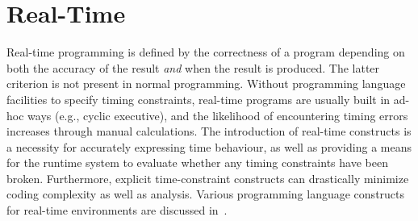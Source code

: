 \documentclass[openright,twoside]{report}
\begin{document}
\begin{comment}
To obtain parallel execution, it is necessary to create a number of virtual processors so more than one task can be scheduled at a time.
Virtual processors are created by modifying the program to create objects of class \LGinlinetrue\LGbegin\lgrinde\L{\LB{\V{uProcessor}}}\endlgrinde\LGend{} (see Section \ref{s:Processors}).
By creating and deleting \LGinlinetrue\LGbegin\lgrinde\L{\LB{\V{uProcessor}}}\endlgrinde\LGend{} objects it is possible to control precisely the parallelism available at any point in the program.
For some programs it may be desirable to control the level of parallelism from outside the program, just as the number of OpenMP threads can be controlled using the environment variable \LGinlinetrue\LGbegin\lgrinde\L{\LB{\V{OMP\_NUM\_THREADS}}}\endlgrinde\LGend{}.
For this reason, the environment variable \LGinlinetrue\LGbegin\lgrinde\L{\LB{\V{UOMP\_NUM\_PROCESSORS}}}\endlgrinde\LGend{} specifies a number of virtual processors to be created at program startup\footnote{A \uC program only respects \LGinlinetrue\LGbegin\lgrinde\L{\LB{\V{UOMP\_NUM\_PROCESSORS}}}\endlgrinde\LGend{} if it is linked with the appropriate OpenMP-enabling command-line argument (\LGinlinetrue\LGbegin\lgrinde\L{\LB{\-\V{openmp}}}\endlgrinde\LGend{} or \LGinlinetrue\LGbegin\lgrinde\L{\LB{\-\V{fopenmp}}}\endlgrinde\LGend{}).}.
These virtual processors are outside the direct control of the program, and so there is no way to delete one of these processors or otherwise reduce the number of virtual processors during execution.
Note that to realize hardware parallelism, it is necessary to use the \uC multikernel, i.e., compile and link with \LGinlinetrue\LGbegin\lgrinde\L{\LB{\-\V{multi}}}\endlgrinde\LGend{}\index{-multi@\LGinlinetrue\LGbegin\lgrinde\L{\LB{\-\V{multi}}}\endlgrinde\LGend{} option}\index{compilation option!-multi@\LGinlinetrue\LGbegin\lgrinde\L{\LB{\-\V{multi}}}\endlgrinde\LGend{}} (see Section \ref{s:CompilinguCProgram}).
\end{comment}


\chapter{Real-Time}
\label{c:RealTime}

Real-time programming is defined by the correctness of a program depending on both the accuracy of the result \emph{and} when the result is produced.
The latter criterion is not present in normal programming.
Without programming language facilities to specify timing constraints, real-time programs are usually built in ad-hoc ways (e.g., cyclic executive), and the likelihood of encountering timing errors increases through manual calculations.
The introduction of real-time constructs is a necessity for accurately expressing time behaviour, as well as providing a means for the runtime system to evaluate whether any timing constraints have been broken.
Furthermore, explicit time-constraint constructs can drastically minimize coding complexity as well as analysis.
Various programming language constructs for real-time environments are discussed in~\cite{Sahraoui92,Martin78,Lin88,Klingerman86,Kenny91,Ishikawa90,Halang92a,Gehani91,Chung95,Ripps90}.
\end{document}

